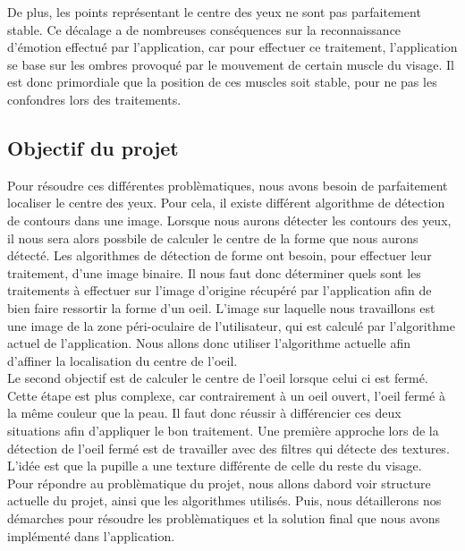 De plus, les points représentant le centre des yeux ne sont pas parfaitement stable. Ce décalage a de 
nombreuses conséquences sur la reconnaissance d'émotion effectué par l'application, car pour effectuer
ce traitement, l'application se base sur les ombres provoqué par le mouvement de certain muscle du 
visage. Il est donc primordiale que la position de ces muscles soit stable, pour ne pas les confondres
lors des traitements.\\

\subsection{Objectif du projet}
Pour résoudre ces différentes problèmatiques, nous avons besoin de parfaitement localiser le centre des
yeux. Pour cela, il existe différent algorithme de détection de contours dans une image. Lorsque nous aurons
détecter les contours des yeux, il nous sera alors possbile de calculer le centre de la forme
que nous aurons détecté. Les algorithmes de détection de forme ont besoin, pour effectuer leur traitement,
d'une image binaire. Il nous faut donc déterminer quels sont les traitements à effectuer
sur l'image d'origine récupéré par l'application afin de bien faire ressortir la forme d'un oeil. L'image
sur laquelle nous travaillons est une image de la zone péri-oculaire de l'utilisateur, qui est calculé par
l'algorithme actuel de l'application. Nous allons donc utiliser l'algorithme actuelle afin d'affiner la localisation
du centre de l'oeil.\\

Le second objectif est de calculer le centre de l'oeil lorsque celui ci est fermé. Cette étape est plus complexe,
car contrairement à un oeil ouvert, l'oeil fermé à la même couleur que la peau. Il faut donc réussir à différencier ces
deux situations afin d'appliquer le bon traitement. Une première approche lors de la détection de l'oeil fermé est 
de travailler avec des filtres qui détecte des textures. L'idée est que la pupille a une texture différente de celle 
du reste du visage.\\

Pour répondre au problèmatique du projet, nous allons dabord voir structure actuelle du projet, ainsi que les algorithmes
utilisés. Puis, nous détaillerons nos démarches pour résoudre les problèmatiques et la solution final que nous avons
implémenté dans l'application.

\newpage
